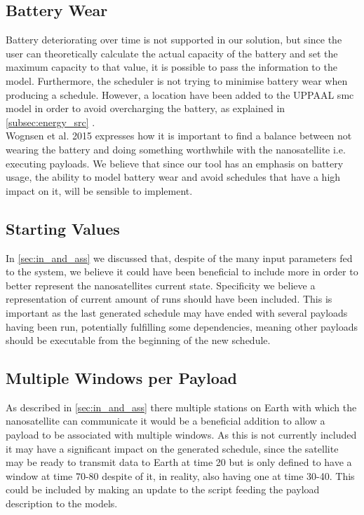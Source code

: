 \subsection*{Battery Wear}
Battery deteriorating over time is not supported in our solution, but since the user can theoretically calculate the actual capacity of the battery and set the maximum capacity to that value, it is possible to pass the information to the model. Furthermore, the scheduler is not trying to minimise battery wear when producing a schedule. However, a location have been added to the UPPAAL \gls{smc} model in order to avoid overcharging the battery, as explained in \ref{subsec:energy_src} .\\
Wognsen et al. 2015\cite{score_function} expresses how it is important to find a balance between not wearing the battery and doing something worthwhile with the nanosatellite i.e. executing payloads. We believe that since our tool has an emphasis on battery usage, the ability to model battery wear and avoid schedules that have a high impact on it, will be sensible to implement. 

\subsection*{Starting Values} \label{ssec:start_val}
In \cref{sec:in_and_ass} we discussed that, despite of the many input parameters fed to the system, we believe it could have been beneficial to include more in order to better represent the nanosatellites current state. Specificity we believe a representation of current amount of runs should have been included. This is important as the last generated schedule may have ended with several payloads having been run, potentially fulfilling some dependencies, meaning other payloads should be executable from the beginning of the new schedule.

\subsection*{Multiple Windows per Payload}\label{ssec:multi_window}
As described in \cref{sec:in_and_ass} there multiple stations on Earth with which the nanosatellite can communicate it would be a beneficial addition to allow a payload to be associated with multiple windows. As this is not currently included it may have a significant impact on the generated schedule, since the satellite may be ready to transmit data to Earth at time 20 but is only defined to have a window at time 70-80 despite of it, in reality, also having one at time 30-40. This could be included by making an update to the script feeding the payload description to the models.

